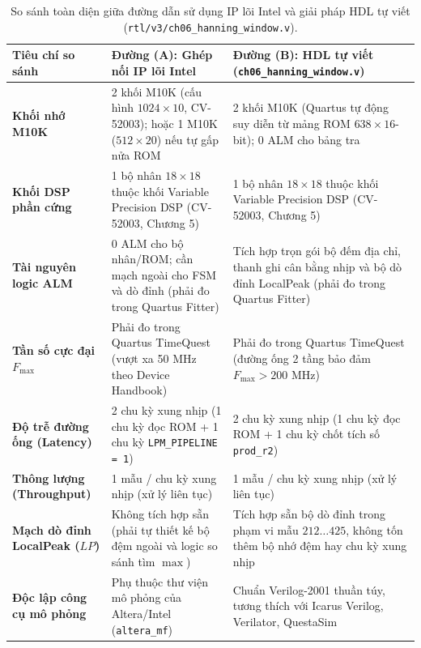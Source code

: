 \begin{table}[H]
\centering
\small
\caption{So sánh toàn diện giữa đường dẫn sử dụng IP lõi Intel và giải pháp HDL tự viết (\texttt{rtl/v3/ch06\_hanning\_window.v}).}
\label{tab:ch06_ip_vs_hdl}
\begin{tabularx}{\textwidth}{p{3.2cm}XX}
\toprule
\textbf{Tiêu chí so sánh} & \textbf{Đường (A): Ghép nối IP lõi Intel} & \textbf{Đường (B): HDL tự viết (\texttt{ch06\_hanning\_window.v})} \\
\midrule
\textbf{Khối nhớ M10K} & 2 khối M10K (cấu hình $1024 \times 10$, CV-52003); hoặc 1 M10K ($512 \times 20$) nếu tự gấp nửa ROM & 2 khối M10K (Quartus tự động suy diễn từ mảng ROM $638 \times 16$-bit); 0 ALM cho bảng tra \\
\addlinespace[2pt]
\textbf{Khối DSP phần cứng} & 1 bộ nhân $18 \times 18$ thuộc khối Variable Precision DSP (CV-52003, Chương 5) & 1 bộ nhân $18 \times 18$ thuộc khối Variable Precision DSP (CV-52003, Chương 5) \\
\addlinespace[2pt]
\textbf{Tài nguyên logic ALM} & 0 ALM cho bộ nhân/ROM; cần mạch ngoài cho FSM và dò đỉnh (phải đo trong Quartus Fitter) & Tích hợp trọn gói bộ đếm địa chỉ, thanh ghi cân bằng nhịp và bộ dò đỉnh LocalPeak (phải đo trong Quartus Fitter) \\
\addlinespace[2pt]
\textbf{Tần số cực đại $F_{\max}$} & Phải đo trong Quartus TimeQuest (vượt xa 50 MHz theo Device Handbook) & Phải đo trong Quartus TimeQuest (đường ống 2 tầng bảo đảm $F_{\max} > 200\text{ MHz}$) \\
\addlinespace[2pt]
\textbf{Độ trễ đường ống (Latency)} & 2 chu kỳ xung nhịp (1 chu kỳ đọc ROM + 1 chu kỳ \texttt{LPM\_PIPELINE = 1}) & 2 chu kỳ xung nhịp (1 chu kỳ đọc ROM + 1 chu kỳ chốt tích số \texttt{prod\_r2}) \\
\addlinespace[2pt]
\textbf{Thông lượng (Throughput)} & 1 mẫu / chu kỳ xung nhịp (xử lý liên tục) & 1 mẫu / chu kỳ xung nhịp (xử lý liên tục) \\
\addlinespace[2pt]
\textbf{Mạch dò đỉnh LocalPeak ($LP$)} & Không tích hợp sẵn (phải tự thiết kế bộ đệm ngoài và logic so sánh tìm $\max$) & Tích hợp sẵn bộ dò đỉnh trong phạm vi mẫu $212 \dots 425$, không tốn thêm bộ nhớ đệm hay chu kỳ xung nhịp \\
\addlinespace[2pt]
\textbf{Độc lập công cụ mô phỏng} & Phụ thuộc thư viện mô phỏng của Altera/Intel (\texttt{altera\_mf}) & Chuẩn Verilog-2001 thuần túy, tương thích với Icarus Verilog, Verilator, QuestaSim \\
\bottomrule
\end{tabularx}
\end{table}


